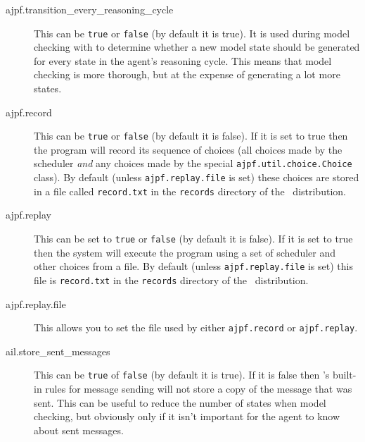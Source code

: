 \documentclass[a4]{article}
\begin{document}
\begin{description}
\item[ajpf.transition\_every\_reasoning\_cycle] This can be \texttt{true} or \texttt{false} (by default it is true).  It is used during model checking with \ajpf{} to determine whether a new model state should be generated for every state in the agent's reasoning cycle.  This means that model checking is more thorough, but at the expense of generating a lot more states.
\item[ajpf.record] This can be \texttt{true} or \texttt{false} (by default  it is false).  If it is set to true then the program will record its sequence of choices (all choices made by the scheduler \emph{and} any choices made by the special \texttt{ajpf.util.choice.Choice} class).  By default (unless \texttt{ajpf.replay.file} is set) these choices are stored in a file called \texttt{record.txt} in the \texttt{records} directory of the \mcapl\ distribution.
\item[ajpf.replay] This can be set to \texttt{true} or \texttt{false} (by default it is false).  If it is set to true then the system will execute the program using a set of scheduler and other choices from a file.  By default (unless \texttt{ajpf.replay.file} is set) this  file is  \texttt{record.txt} in the \texttt{records} directory of the \mcapl\ distribution.
\item[ajpf.replay.file] This allows you to set the file used by either \texttt{ajpf.record} or \texttt{ajpf.replay}.
\item[ail.store\_sent\_messages]  This can be \texttt{true} of \texttt{false} (by default it is true).  If it is false then \ail{}'s built-in rules for message sending will not store a copy of the message that was sent.  This can be useful to reduce the number of states when model checking, but obviously only if it isn't important for the agent to know about sent messages.
\end{description}
\end{document}

